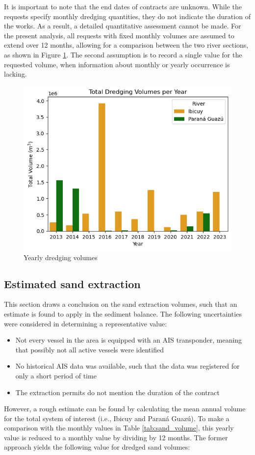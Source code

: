 It is important to note that the end dates of contracts are unknown. While the requests specify monthly dredging quantities, they do not indicate the duration of the works. As a result, a detailed quantitative assessment cannot be made. For the present analysis, all requests with fixed monthly volumes are assumed to extend over 12 months, allowing for a comparison between the two river sections, as shown in Figure \ref{fig:yearly dredging volumes}. The second assumption is to record a single value for the requested volume, when information about monthly or yearly occurrence is lacking.

\begin{figure}[H]
    \centering
    \includegraphics[width=0.50\linewidth]{figures/ch2/Dredging volumes permits.png}
    \caption{Yearly dredging volumes}
    \label{fig:yearly dredging volumes}
\end{figure}

\subsection{Estimated sand extraction}
This section draws a conclusion on the sand extraction volumes, such that an estimate is found to apply in the sediment balance. The following uncertainties were considered in determining a representative value:

\begin{itemize}
    \item Not every vessel in the area is equipped with an AIS transponder, meaning that possibly not all active vessels were identified
    \item No historical AIS data was available, such that the data was registered for only a short period of time 
    \item The extraction permits do not mention the duration of the contract
\end{itemize}

However, a rough estimate can be found by calculating the mean annual volume for the total system of interest (i.e., Ibicuy and Paraná Guazú). To make a comparison with the monthly values in Table \ref{tab:sand_volume}, this yearly value is reduced to a monthly value by dividing by 12 months. The former approach yields the following value for dredged sand volumes:

